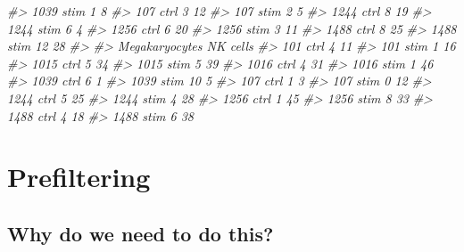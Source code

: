 \documentclass[
]{book}
\newenvironment{Shaded}{\begin{snugshade}}{\end{snugshade}}
\newcommand{\CommentTok}[1]{\textcolor[rgb]{0.56,0.35,0.01}{\textit{#1}}}
\begin{document}
\begin{Shaded}
\begin{Highlighting}[]
\CommentTok{\#\textgreater{}   1039 stim               1                 8}
\CommentTok{\#\textgreater{}   107 ctrl                3                12}
\CommentTok{\#\textgreater{}   107 stim                2                 5}
\CommentTok{\#\textgreater{}   1244 ctrl               8                19}
\CommentTok{\#\textgreater{}   1244 stim               6                 4}
\CommentTok{\#\textgreater{}   1256 ctrl               6                20}
\CommentTok{\#\textgreater{}   1256 stim               3                11}
\CommentTok{\#\textgreater{}   1488 ctrl               8                25}
\CommentTok{\#\textgreater{}   1488 stim              12                28}
\CommentTok{\#\textgreater{}            }
\CommentTok{\#\textgreater{}             Megakaryocytes NK cells}
\CommentTok{\#\textgreater{}   101 ctrl               4       11}
\CommentTok{\#\textgreater{}   101 stim               1       16}
\CommentTok{\#\textgreater{}   1015 ctrl              5       34}
\CommentTok{\#\textgreater{}   1015 stim              5       39}
\CommentTok{\#\textgreater{}   1016 ctrl              4       31}
\CommentTok{\#\textgreater{}   1016 stim              1       46}
\CommentTok{\#\textgreater{}   1039 ctrl              6        1}
\CommentTok{\#\textgreater{}   1039 stim             10        5}
\CommentTok{\#\textgreater{}   107 ctrl               1        3}
\CommentTok{\#\textgreater{}   107 stim               0       12}
\CommentTok{\#\textgreater{}   1244 ctrl              5       25}
\CommentTok{\#\textgreater{}   1244 stim              4       28}
\CommentTok{\#\textgreater{}   1256 ctrl              1       45}
\CommentTok{\#\textgreater{}   1256 stim              8       33}
\CommentTok{\#\textgreater{}   1488 ctrl              4       18}
\CommentTok{\#\textgreater{}   1488 stim              6       38}
\end{Highlighting}
\end{Shaded}

\hypertarget{prefiltering}{%
\section{Prefiltering}\label{prefiltering}}

\hypertarget{why-do-we-need-to-do-this-2}{%
\subsection*{Why do we need to do this?}\label{why-do-we-need-to-do-this-2}}
\end{document}
